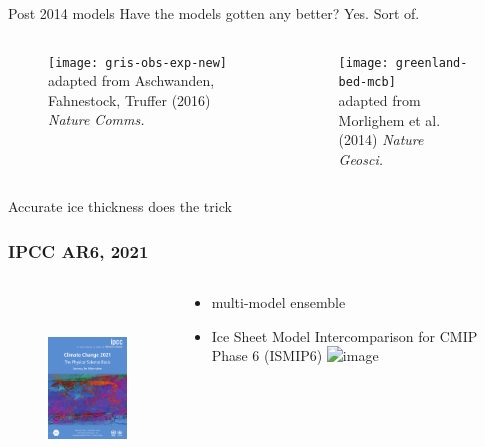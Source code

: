 \documentclass[hide notes,intlimits]{beamer}
\begin{document}
\begin{frame}{Post 2014 models}
  \alert{Have the models gotten any better? Yes. Sort of.}
  \begin{columns}[c]
    \begin{column}{.6\linewidth}
    \begin{figure}
      \texttt{[image: gris-obs-exp-new]}
      \\ \tiny{adapted from Aschwanden, Fahnestock, Truffer (2016) \textit{Nature Comms.}}
    \end{figure}
    \end{column}
    \begin{column}{.4\linewidth}
      \begin{figure}
        \texttt{[image: greenland-bed-mcb]}
      \\ \tiny{adapted from Morlighem et al. (2014) \textit{Nature Geosci.}}
      \end{figure}
    \end{column}
  \end{columns}
  \alert{Accurate ice thickness does the trick}
  
\end{frame}


\begin{frame}
  \frametitle{IPCC AR6, 2021}
  \begin{columns}[c]
    \begin{column}{.4\linewidth}
      \begin{figure}
        \includegraphics[height=5cm]{ar6-wg1}
      \end{figure}
    \end{column}
    \begin{column}{.6\linewidth}
      \begin{itemize}
      \item multi-model ensemble
      \item Ice Sheet Model Intercomparison for CMIP Phase 6 (ISMIP6)
        \includegraphics<1>[width=2cm]{ismip6_logo}
      \end{itemize}
    \end{column}
  \end{columns}
\end{frame}
\end{document}
